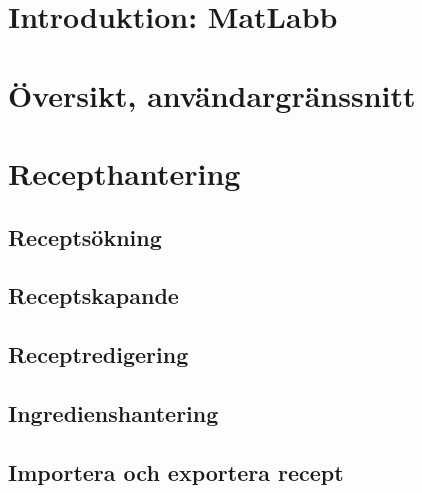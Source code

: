 
\chapter{Introduktion: MatLabb}


\chapter{Översikt, användargränssnitt}


\chapter{Recepthantering}

  \section{Receptsökning}
  
  \section{Receptskapande}
  
  \section{Receptredigering}
  
  \section{Ingredienshantering}
  
  \section{Importera och exportera recept}
  
  
